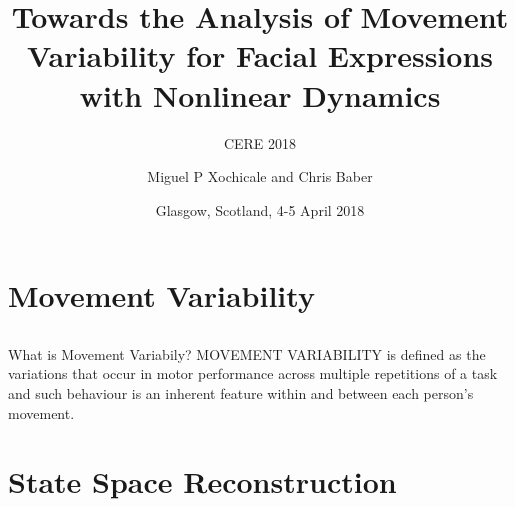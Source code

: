 \documentclass[compress]{beamer}
\title{Towards the Analysis of Movement Variability for Facial Expressions  \\ 
	with Nonlinear Dynamics}
\subtitle{CERE 2018}
\date{Glasgow, Scotland, 4-5 April 2018}
\author{Miguel P Xochicale and Chris Baber}
\institute{School of Engineering \\{\bf University of Birmingham}}
\begin{document}

\maketitle





%
\section{Movement Variability}


\subsection{}
{


\begin{frame}{What is Movement Variabily?}
MOVEMENT VARIABILITY is defined as the variations that occur in motor
performance across multiple repetitions of a task and such behaviour is 
an inherent feature within and between each person's movement.
\end{frame}
}



\section{State Space Reconstruction}



\end{document}
